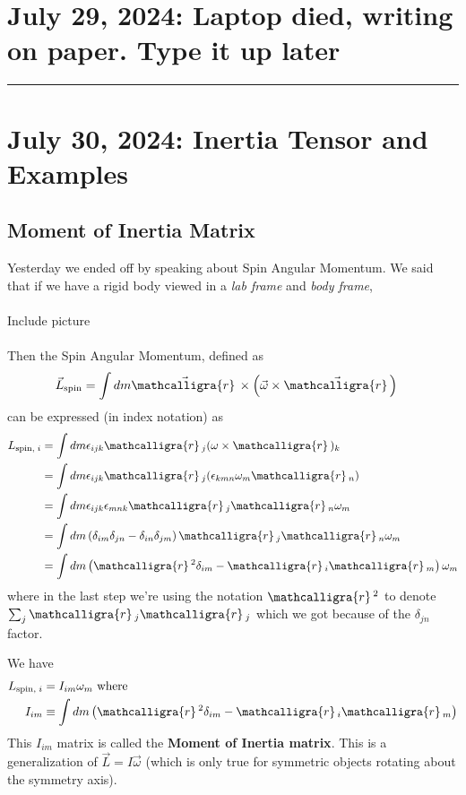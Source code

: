 \documentclass[11pt]{article}
\newcommand{\scriptr}{\mathcalligra{r}\,}
\begin{document}
\pagebreak
\section{July 29, 2024: Laptop died, writing on paper. Type it up later}

\hrule

\pagebreak
\section{July 30, 2024: Inertia Tensor and Examples}

\subsection{Moment of Inertia Matrix}
Yesterday we ended off by speaking about Spin Angular Momentum. We said that if we have a rigid body viewed in a \emph{lab frame} and \emph{body frame}, 
\\
\\
Include picture
\\
\\
Then the Spin Angular Momentum, defined as 
\begin{align*}
  \vec{L}_{\text{spin}} &= \int dm \vec{\scriptr} \times \left( \vec{\omega} \times \vec{\scriptr} \right)
\end{align*}
can be expressed (in index notation) as 
\begin{align*}
  L_{\text{spin}, \;i} &= \int dm \epsilon_{ijk} \scriptr_{j} (\omega \times \scriptr)_{k} \\
  &= \int dm \epsilon_{ijk} \scriptr_{j} (\epsilon_{kmn} \omega_{m} \scriptr_{n}) \\
  &= \int dm \epsilon_{ijk}  \epsilon_{mnk} \scriptr_{j} \scriptr_{n} \omega_{m}  \\
  &= \int dm \left( \delta_{im} \delta_{jn} - \delta_{in} \delta_{jm} \right) \scriptr_{j} \scriptr_{n} \omega_{m}  \\
  &= \int dm \left( \scriptr^2 \delta_{im} - \scriptr_i \scriptr_{m} \right) \omega_{m}
\end{align*}
where in the last step we're using the notation $\scriptr^2$ to denote $\sum_{j} \scriptr_{j} \scriptr_{j}$ which we got because of the $\delta_{jn}$ factor.
\begin{redbox}
  We have 
\begin{align*}
  L_{\text{spin}, \;i} &= I_{im} \omega_{m} \text{ where} \\
  I_{im} &\equiv \int dm \left( \scriptr^2 \delta_{im} - \scriptr_i \scriptr_{m} \right) 
\end{align*} This $I_{im}$ matrix is called the \textbf{Moment of Inertia matrix}. This is a generalization of $\vec{L} = I\vec{\omega}$ (which is only true for symmetric objects rotating about the symmetry axis).
\end{redbox}
\end{document}
